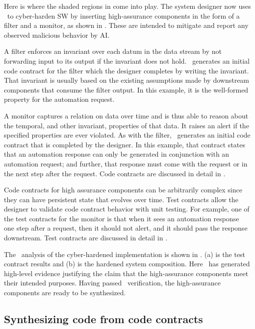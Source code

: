 Here is where the shaded regions in  come into play.
The system designer now uses \brfcs\ to cyber-harden SW by inserting
high-assurance components in the form of a filter and a monitor, as
shown in .
These are intended to mitigate and report any observed malicious behavior by AI.

A filter enforces an invariant over
each datum in the data stream by not forwarding input to its output if the invariant does not hold.
\brfcs\ generates an initial code contract for the filter which the designer completes by writing the invariant.
That invariant is usually based on the existing assumptions made by
downstream components that consume the filter output.
In this example, it is the well-formed property for the automation request.

A monitor captures a relation on data over time and is thus able
to reason about the temporal, and other invariant, properties of that data.  It raises
an alert if the specified properties are ever violated.
As with the filter, \brfcs\ generates an initial code contract that is completed by the designer.
In this example, that contract states that an
automation response can only be generated in conjunction with an
automation request; and further, that response must come with the
request or in the next step after the request.
Code contracts are discussed in detail in .

Code contracts for high assurance components can be arbitrarily complex since they can have persistent state that evolves over time.
Test contracts allow the designer to validate code contract behavior with unit testing.
For example, one of the test contracts for the monitor is that when it sees an automation response one step after a request, then it should not alert, and it should pass the response downstream.
Test contracts are discussed in detail in .

The \agr\ analysis of the cyber-hardened implementation is shown in
.
(a) is the test contract results and (b) is the hardened system composition.
Here \agr\ has generated high-level
evidence justifying the claim that the high-assurance components meet their intended purposes.
Having passed \agr\ verification, the high-assurance components are ready to be
synthesized.

\subsection{Synthesizing code from code contracts}

